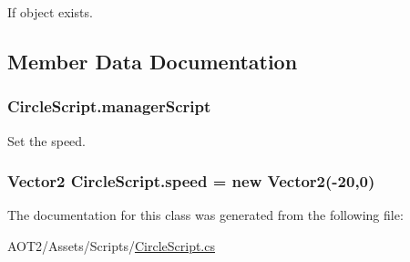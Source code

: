 If object exists. 

\subsection{Member Data Documentation}
\hypertarget{class_circle_script_ac766a11165e1111c478837fae3df9c19}{
\subsubsection[{manager\-Script}]{ Circle\-Script.\-manager\-Script}}\label{class_circle_script_ac766a11165e1111c478837fae3df9c19}


Set the speed. 

\hypertarget{class_circle_script_a4b8a0a38630b44c7e210b8b6be2549c2}{
\subsubsection[{speed}]{\setlength{\rightskip}{0pt plus 5cm}Vector2 Circle\-Script.\-speed = new Vector2(-\/20,0)}}\label{class_circle_script_a4b8a0a38630b44c7e210b8b6be2549c2}


The documentation for this class was generated from the following file\-:\begin{DoxyCompactItemize}
\item 
A\-O\-T2/\-Assets/\-Scripts/\hyperlink{_circle_script_8cs}{Circle\-Script.\-cs}\end{DoxyCompactItemize}
